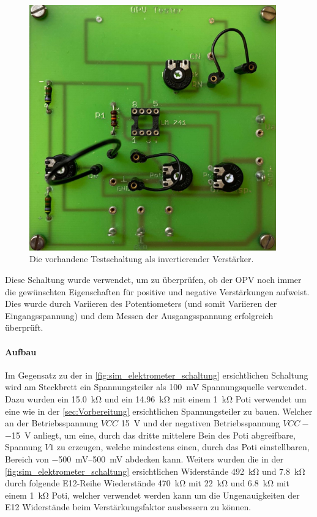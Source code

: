 \documentclass[12pt,english,ngerman]{scrartcl}
\begin{document}
\begin{figure}[H]
  \centering
    \includegraphics[width=0.95\textwidth]{./figures/testschaltung.jpeg}
  \caption{Die vorhandene Testschaltung als invertierender Verstärker.}
  \label{fig:testschaltung}
\end{figure}

Diese Schaltung wurde verwendet, um zu überprüfen, ob der OPV noch immer die
gewünschten Eigenschaften für positive und negative Verstärkungen aufweist. Dies
wurde durch Variieren des Potentiometers (und somit Variieren der
Eingangsspannung) und dem Messen der Ausgangsspannung erfolgreich überprüft.

\paragraph{Aufbau}
Im Gegensatz zu der in \autoref{fig:sim_elektrometer_schaltung} ersichtlichen
Schaltung wird am Steckbrett ein Spannungsteiler als \SI{100}{mV}
Spannungsquelle verwendet. Dazu wurden ein \SI{15.0}{\kilo\ohm} und ein
\SI{14.96}{\kilo\ohm} mit einem \SI{1}{\kilo\ohm} Poti verwendet um eine wie in
der \autoref{sec:Vorbereitung} ersichtlichen Spannungsteiler zu bauen. Welcher
an der Betriebsspannung $VCC$ \SI{+15}{\volt} und der negativen
Betriebsspannung $VCC-$ \SI{-15}{\volt} anliegt, um eine, durch das dritte
mittelere Bein des Poti abgreifbare, Spannung $V1$ zu erzeugen, welche
mindestens einen, durch das Poti einstellbaren, Bereich von
\SIrange{-500}{500}{\milli\volt} abdecken kann. Weiters wurden die in der
\autoref{fig:sim_elektrometer_schaltung} ersichtlichen Widerstände
\SI{492}{\kilo\ohm} und \SI{7.8}{\kilo\ohm} durch folgende E12-Reihe
Wiederstände \SI{470}{\kilo\ohm} mit \SI{22}{\kilo\ohm} und \SI{6.8}{\kilo\ohm}
mit einem \SI{1}{\kilo\ohm} Poti, welcher verwendet werden kann um die
Ungenauigkeiten der E12 Widerstände beim Verstärkungsfaktor ausbessern zu
können.
\end{document}
